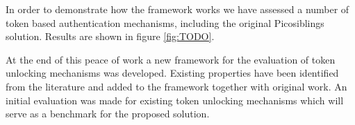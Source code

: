 In order to demonstrate how the framework works we have assessed a number of token based authentication mechanisms, including the original Picosiblings solution. Results are shown in figure \ref{fig:TODO}. 

At the end of this peace of work a new framework for the evaluation of token unlocking mechanisms was developed. Existing properties have been identified from the literature and added to the framework together with original work. An initial evaluation was made for existing token unlocking mechanisms which will serve as a benchmark for the proposed solution.
